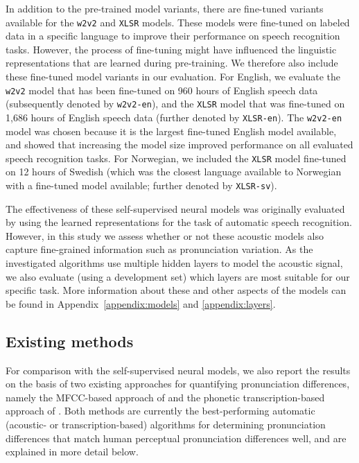 \documentclass[11pt,a4paper]{article}
\begin{document}
In addition to the pre-trained model variants, there are fine-tuned variants available for the \texttt{w2v2} and \texttt{XLSR} models.
These models were fine-tuned on labeled data in a specific language to improve their performance on speech recognition tasks.
However, the process of fine-tuning might have influenced the linguistic representations that are learned during pre-training.
We therefore also include these fine-tuned model variants in our evaluation.
For English, we evaluate the \texttt{w2v2} model that has been fine-tuned on 960 hours of English speech data (subsequently denoted by \texttt{w2v2-en}), and the \texttt{XLSR} model that was fine-tuned on 1,686 hours of English speech data (further denoted by \texttt{XLSR-en}). The \texttt{w2v2-en} model was chosen because it is the largest fine-tuned English model available, and \citet{baevski2020wav2vec} showed that increasing the model size improved performance on all evaluated speech recognition tasks. For Norwegian, we included the \texttt{XLSR} model fine-tuned on 12 hours of Swedish (which was the closest language available to Norwegian with a fine-tuned model available; further denoted by \texttt{XLSR-sv}).

The effectiveness of these self-supervised neural models was originally evaluated by using the learned representations for the task of automatic speech recognition.
However, in this study we assess whether or not these acoustic models also capture fine-grained information such as pronunciation variation. 
As the investigated algorithms use multiple hidden layers to model the acoustic signal, we also evaluate (using a development set) which layers are most suitable for our specific task.
More information about these and other aspects of the models can be found in Appendix~\ref{appendix:models} and \ref{appendix:layers}.

\subsection{Existing methods}
\label{sec:methods:existing}
For comparison with the self-supervised neural models, we also report the results on the basis of two existing approaches for quantifying pronunciation differences, namely the MFCC-based approach of \citet{acoustic-measure} and the phonetic transcription-based approach of \citet{wieling2012inducing}. Both methods are currently the best-performing automatic (acoustic- or transcription-based) algorithms for determining pronunciation differences that match human perceptual pronunciation differences well, and are explained in more detail below.
\end{document}
